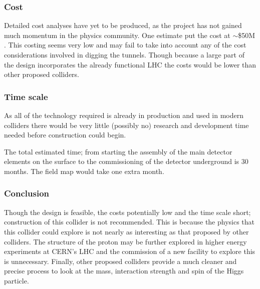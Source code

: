 \subsubsection{Cost}

Detailed cost analyses have yet to be produced, as the project has not gained much momentum in the physics community. One estimate put the cost at $\sim$\$50M \cite{LHeC:Zimmermann}. This costing seems very low and may fail to take into account any of the cost considerations involved in digging the tunnels. Though because a large part of the design incorporates the already functional LHC the costs would be lower than other proposed colliders.
 
 
\subsubsection{Time scale}

As all of the technology required is already in production and used in modern colliders there would be very little (possibly no) research and development time needed before construction could begin.
 
The total estimated time; from starting the assembly of the main detector elements on the surface to the commissioning of the detector underground is 30 months. The field map would take one extra month.
 
\subsubsection{Conclusion}

Though the design is feasible, the costs potentially low and the time scale short; construction of this collider is not recommended. This is because the physics that this collider could explore is not nearly as interesting as that proposed by other colliders. The structure of the proton may be further explored in higher energy experiments at CERN's LHC and the commission of a new facility to explore this is unnecessary. Finally, other proposed colliders provide a much cleaner and precise process to look at the mass, interaction strength and spin of the Higgs particle.